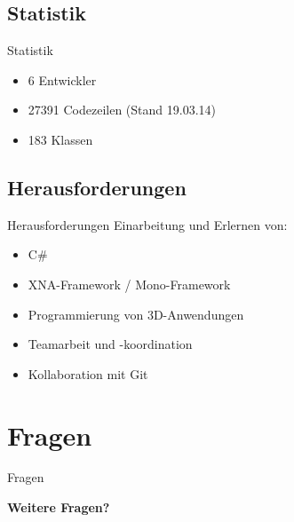 \documentclass[18pt]{beamer}
\begin{document}
\subsection{Statistik}
\begin{frame}{Statistik}
\begin{itemize}
\item 6 Entwickler
\item 27391 Codezeilen (Stand 19.03.14)
\item 183 Klassen
\end{itemize}
\end{frame}

\subsection{Herausforderungen}
\begin{frame} {Herausforderungen}
Einarbeitung und Erlernen von:
\begin{itemize}
\item C\#
\item XNA-Framework / Mono-Framework
\item Programmierung von 3D-Anwendungen
\item Teamarbeit und -koordination
\item Kollaboration mit Git
\end{itemize}
\end{frame}


\section{Fragen}
\begin{frame}{Fragen}
\begin{center}
\Huge \textbf{Weitere Fragen?}
\end{center}
\end{frame}



%
%
\end{document}
